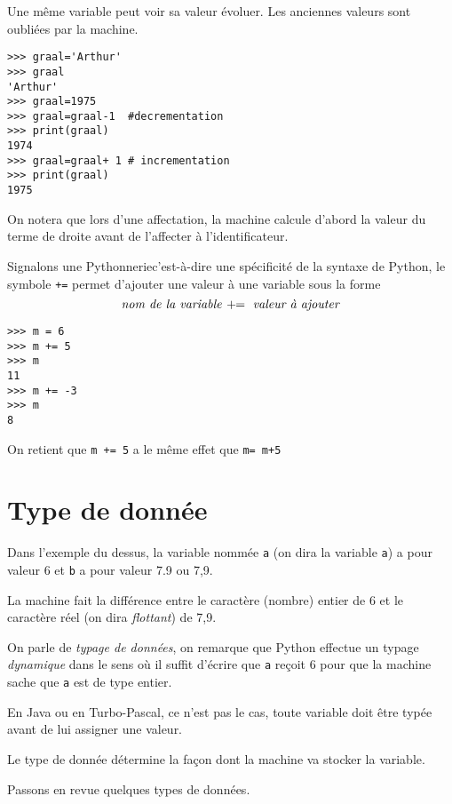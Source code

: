 Une même variable peut voir sa valeur évoluer. Les anciennes valeurs sont oubliées par la machine.
\begin{lstlisting}
>>> graal='Arthur'
>>> graal
'Arthur'
>>> graal=1975
>>> graal=graal-1  #decrementation
>>> print(graal)
1974
>>> graal=graal+ 1 # incrementation
>>> print(graal)
1975
\end{lstlisting}
On notera que lors d'une affectation, la machine calcule d'abord la valeur du terme de droite avant de l'affecter à l'identificateur.\par
Signalons une \og Pythonnerie\fg c'est-à-dire une spécificité de la syntaxe de Python, le symbole \lstinline?+=? permet d'ajouter une valeur à une variable sous la  forme 
$$\hbox{\emph{nom de la variable  }}+\! \! = \hbox{ \it  valeur à ajouter}$$
\begin{lstlisting}
>>> m = 6
>>> m += 5
>>> m
11
>>> m += -3
>>> m
8
\end{lstlisting}
On retient que \lstinline?m += 5? a le même effet que \lstinline?m= m+5?
\section{Type de donnée}
Dans l'exemple du dessus, la variable nommée \lstinline?a? (on dira la variable \lstinline?a?) a pour valeur 6 et \lstinline?b? a pour valeur 7.9 ou 7,9.\par
La machine fait la différence entre le caractère (nombre) entier de 6 et le caractère réel (on dira \emph{flottant}) de 7,9.\par
On parle de \emph{typage de données}, on remarque que Python effectue un typage \emph{dynamique } dans le sens où il suffit d'écrire que \lstinline?a? reçoit 6 pour que la machine sache que \lstinline?a? est de type entier.\par
En Java ou en Turbo-Pascal, ce n'est pas le cas, toute variable doit être typée avant de lui assigner une valeur.\par
Le type de donnée détermine la façon dont la machine va stocker la variable. \par
Passons en revue quelques types de données. 
